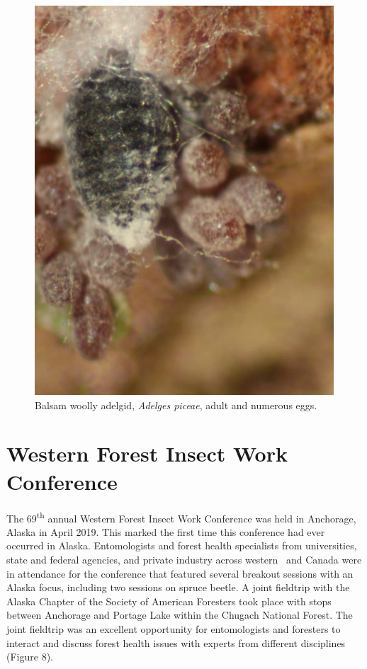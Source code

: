 \begin{figure}[H]
\begin{center}
\includegraphics[width=\textwidth]{img/balsam_woolly_adelgid_adult_eggs.png}
\caption{Balsam woolly adelgid, \textit{Adelges piceae}, adult and numerous eggs.}
\label{balsam_woolly_adelgid_adult_eggs}
\end{center}
\end{figure} 
 
\section{Western Forest Insect Work Conference}

The 69\textsuperscript{th} annual Western Forest Insect Work Conference was held in Anchorage, Alaska in April 2019. This marked the first time this conference had ever occurred in Alaska. Entomologists and forest health specialists from universities, state and federal agencies, and private industry across western \ and Canada were in attendance for the conference that featured several breakout sessions with an Alaska focus, including two sessions on spruce beetle. A joint fieldtrip with the Alaska Chapter of the Society of American Foresters took place with stops between Anchorage and Portage Lake within the Chugach National Forest. The joint fieldtrip was an excellent opportunity for entomologists and foresters to interact and discuss forest health issues with experts from different disciplines (Figure 8).

